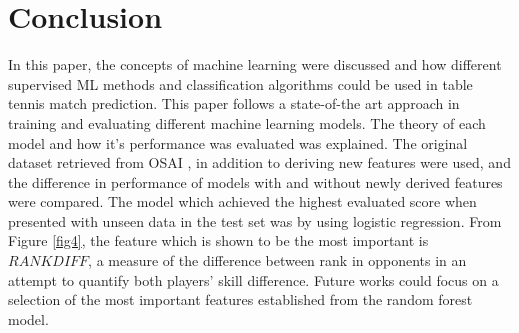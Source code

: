 \section{Conclusion} \label{conc}
In this paper, the concepts of machine learning were discussed and how different supervised ML methods and classification algorithms could be used in table tennis match prediction. 
This paper follows a state-of-the art approach in training and evaluating different machine learning models. The theory of each model and how it's performance was evaluated was explained.
The original dataset retrieved from OSAI \cite{OSAI}, in addition to deriving new features were used, and the difference in performance of models with and without newly derived features were compared.
The model which achieved the highest evaluated score when presented with unseen data in the test set was by using logistic regression. From Figure \ref{fig4}, the feature which is shown to be the most important is $RANKDIFF$, a measure of the difference between rank in opponents in an attempt to quantify both players' skill difference. 
Future works could focus on a selection of the most important features established from the random forest model.